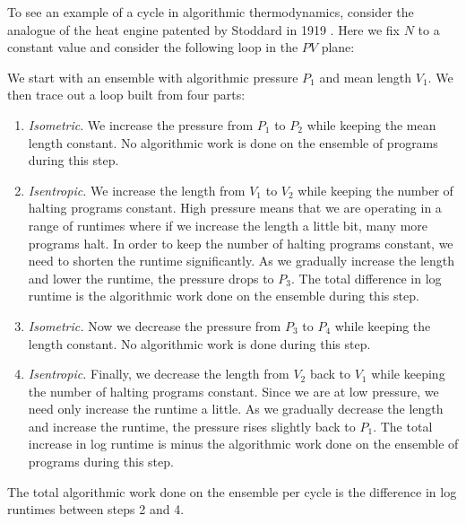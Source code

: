\documentclass[12pt,twoside,openright]{report}
\begin{document}
To see an example of a cycle in algorithmic thermodynamics, consider the analogue of the heat engine patented by Stoddard in 1919
\cite{Stoddard1919}.  Here we fix $N$ to a constant value and consider the following loop in the $PV$ plane:
\begin{center}
\end{center}
We start with an ensemble with algorithmic pressure $P_1$ and mean length $V_1$.  We then trace out a loop built from four parts:

\begin{enumerate}
  \item 
  \emph{Isometric}. We increase the pressure from $P_1$ to $P_2$ while keeping
  the mean length constant.  No algorithmic work is done on the ensemble
  of programs during this step.
  \item
  \emph{Isentropic.} We increase the length from $V_1$ to $V_2$ while keeping
  the number of halting programs constant.  High pressure means 
  that we are operating in a range of runtimes where if we increase
  the length a little bit, many more programs halt.  In order
  to keep the number of halting programs constant,
  we need to shorten the runtime significantly.  As we gradually
  increase the length and lower the runtime, the pressure drops to $P_3$.
  The total difference in log runtime is the algorithmic 
  work done on the ensemble during this step.
  \item
  \emph{Isometric.} Now we decrease the pressure from $P_3$ to $P_4$ while
  keeping the length constant.  No algorithmic work is done during this step.
  \item
  \emph{Isentropic.} Finally, we decrease the length from $V_2$ back to $V_1$
  while keeping the number of halting programs constant.
  Since we are at low pressure, we need only increase the
  runtime a little.  As we gradually decrease the length
  and increase the runtime, the pressure rises slightly
  back to $P_1$.  The total increase in log runtime is minus the algorithmic
  work done on the ensemble of programs during this step.
\end{enumerate}
The total algorithmic work done on the ensemble per cycle is the difference in log runtimes between steps 2 and 4.
\end{document}
